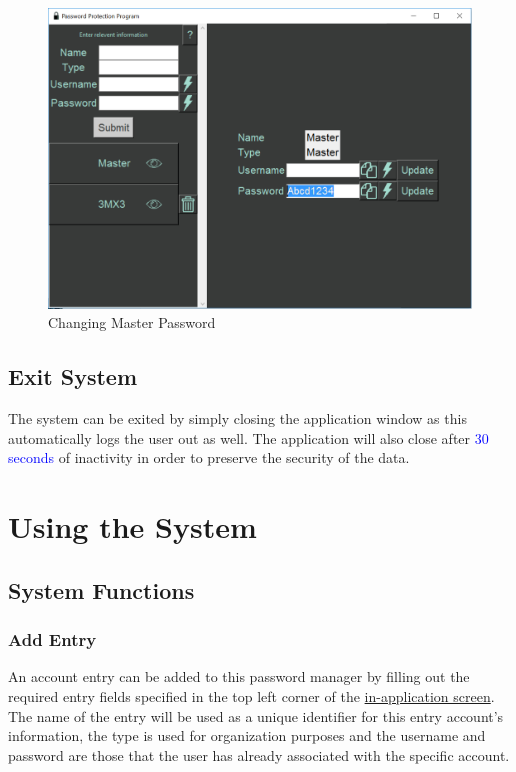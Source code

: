 \documentclass[12pt, titlepage]{article}
\begin{document}
\begin{figure}[h]
	\centering
	\includegraphics[scale=0.7]{images/ChangeMasPass.PNG}
	\caption{Changing Master Password}
	\label{fig:chMasPass}
\end{figure}


\subsection{Exit System} \label{SysExit}

The system can be exited by simply closing the application window as this automatically logs the user out as well. The application will also close after \textcolor{blue}{30 seconds} of inactivity in order to preserve the security of the data.


\newpage
\section{Using the System} \label{SysUse}


\subsection{System Functions} \label{SysFunc}

\subsubsection{Add Entry} \label{AddEnt}

An account entry can be added to this password manager by filling out the required entry fields specified in the top left corner of the \hyperref[fig:InApp]{in-application screen}. The name of the entry will be used as a unique identifier for this entry account's information, the type is used for organization purposes and the username and password are those that the user has already associated with the specific account.
\end{document}
